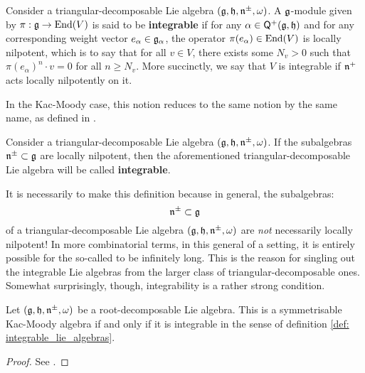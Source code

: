         \begin{definition} \label{def: integrable_modules_over_triangular_decomposable_lie_algebras}
            Consider a triangular-decomposable Lie algebra $(\mathfrak{g}, \mathfrak{h}, \mathfrak{n}^{\pm}, \omega)$. A $\mathfrak{g}$-module given by $\pi: \mathfrak{g} \to \operatorname{End}(V)$ is said to be \textbf{integrable} if for any $\alpha \in \mathsf{Q}^+(\mathfrak{g}, \mathfrak{h})$ and for any corresponding weight vector $e_{\alpha} \in \mathfrak{g}_{\alpha}$, the operator $\pi(e_{\alpha}) \in \operatorname{End}(V)$ is locally nilpotent, which is to say that for all $v \in V$, there exists some $N_v > 0$ such that $\pi(e_{\alpha})^n \cdot v = 0$ for all $n \geq N_v$. More succinctly, we say that $V$ is integrable if $\mathfrak{n}^+$ acts locally nilpotently on it.
        \end{definition}
        In the Kac-Moody case, this notion reduces to the same notion by the same name, as defined in \cite[Chapter 3]{kac_infinite_dimensional_lie_algebras}.
        \begin{definition} \label{def: integrable_lie_algebras}
            Consider a triangular-decomposable Lie algebra $(\mathfrak{g}, \mathfrak{h}, \mathfrak{n}^{\pm}, \omega)$. If the subalgebras $\mathfrak{n}^{\pm} \subset \mathfrak{g}$ are locally nilpotent, then the aforementioned triangular-decomposable Lie algebra will be called \textbf{integrable}.
        \end{definition}
        It is necessarily to make this definition because in general, the  subalgebras:
            $$\mathfrak{n}^{\pm} \subset \mathfrak{g}$$
        of a triangular-decomposable Lie algebra $(\mathfrak{g}, \mathfrak{h}, \mathfrak{n}^{\pm}, \omega)$ are \textit{not} necessarily locally nilpotent! In more combinatorial terms, in this general of a setting, it is entirely possible for the so-called  to be infinitely long. This is the reason for singling out the integrable Lie algebras from the larger class of triangular-decomposable ones. Somewhat surprisingly, though, integrability is a rather strong condition.
        \begin{lemma} \label{lemma: integrable_root_decomposable_lie_algebras_are_symmetrisable_kac_moody_algebras}
            Let $(\mathfrak{g}, \mathfrak{h}, \mathfrak{n}^{\pm}, \omega)$ be a root-decomposable Lie algebra. This is a symmetrisable Kac-Moody algebra if and only if it is integrable in the sense of definition \ref{def: integrable_lie_algebras}.
        \end{lemma}
            \begin{proof}
                See \cite[Propsition 4.1.11]{moody_pianzola_lie_algebras_with_triangular_decompositions}.
            \end{proof}

